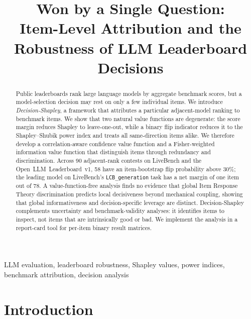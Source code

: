 \documentclass[conference]{IEEEtran}
\begin{document}
\title{Won by a Single Question:\\Item-Level Attribution and the Robustness of LLM Leaderboard Decisions}

\author{
}

\maketitle

\begin{abstract}
Public leaderboards rank large language models by aggregate benchmark scores, but a model-selection decision may rest on only a few individual items.
We introduce \emph{Decision-Shapley}, a framework that attributes a particular adjacent-model ranking to benchmark items.
We show that two natural value functions are degenerate: the score margin reduces Shapley to leave-one-out, while a binary flip indicator reduces it to the Shapley--Shubik power index and treats all same-direction items alike.
We therefore develop a correlation-aware confidence value function and a Fisher-weighted information value function that distinguish items through redundancy and discrimination.
Across 90 adjacent-rank contests on LiveBench and the Open~LLM~Leaderboard~v1, 58 have an item-bootstrap flip probability above 30\%; the leading model on LiveBench's \texttt{LCB\_generation} task has a net margin of one item out of 78.
A value-function-free analysis finds no evidence that global Item Response Theory discrimination predicts local decisiveness beyond mechanical coupling, showing that global informativeness and decision-specific leverage are distinct.
Decision-Shapley complements uncertainty and benchmark-validity analyses: it identifies items to inspect, not items that are intrinsically good or bad.
We implement the analysis in a report-card tool for per-item binary result matrices.
\end{abstract}

\begin{IEEEkeywords}
LLM evaluation, leaderboard robustness, Shapley values, power indices, benchmark attribution, decision analysis
\end{IEEEkeywords}

\section{Introduction}
\label{sec:intro}
\end{document}

